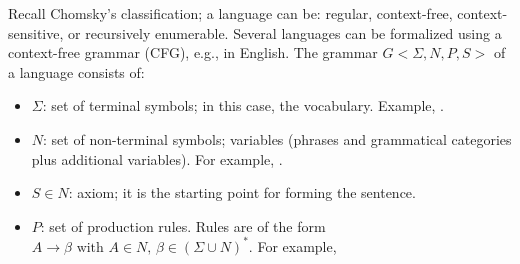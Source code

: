 \documentclass{KodeBook}
\begin{document}
Recall Chomsky's classification; a language can be: regular, context-free, context-sensitive, or recursively enumerable. 
Several languages can be formalized using a context-free grammar (CFG), e.g., in English. 
The grammar $G <\Sigma, N, P, S>$ of a language consists of:
\begin{itemize}
	\item $\Sigma$: set of terminal symbols; in this case, the vocabulary. 
	Example, . 
	
	\item $N$: set of non-terminal symbols; variables (phrases and grammatical categories plus additional variables). 
	For example, .
	
	\item $S \in N$: axiom; it is the starting point for forming the sentence. 
	
	\item $P$: set of production rules.
	Rules are of the form $A \rightarrow \beta \text{ with } A \in N,\, \beta \in (\Sigma \cup N)^*$.
	For example, 
\end{itemize}
\end{document}
